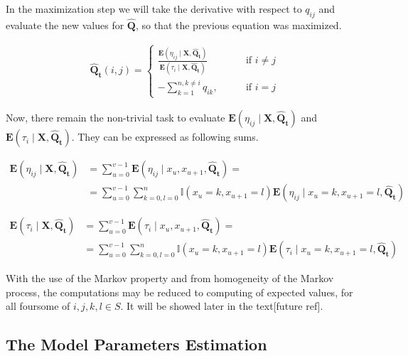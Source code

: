 \documentclass[thesis=M,english]{FITthesis}[2012/10/20]
\newcommand{\matr}[1]{\mathbf{#1}}
\begin{document}
In the maximization step we will take the derivative with respect to $q_{ij}$ and evaluate the new values for $\matr{ \hat Q }$, so that the previous equation was maximized. 

\begin{equation}\label{eq:Qmax}
\begin{aligned}  
\matr{ \hat Q_t }(i,j)= 
\begin{cases}
\frac{ \mathbf{E}(\eta_{ij} \mid \matr{X}, \matr{ \hat Q_t } )}{ \mathbf{E}( \tau_i \mid \matr{X}, \matr{\hat Q_t} ) } & \text{if } i\neq j\\
- \sum\limits_{k=1}^{n,k \neq i} q_{ik}, \qquad & \text{if } i=j
\end{cases}
\end{aligned}
\end{equation}

Now, there remain the non-trivial task to evaluate $\mathbf{E}( \eta_{ij} \mid \matr{X}, \matr{\hat Q_t} )$ and $\mathbf{E}( \tau_i \mid \matr{X}, \matr{ \hat Q_t } )$. They can be expressed as following sums.


\begin{equation}
\begin{aligned}  
\mathbf{E}(\eta_{ij} \mid \matr{X}, \matr{\hat Q_t} ) &= \sum_{u=0}^{v-1} \mathbf{E}(\eta_{ij} \mid x_u, x_{u+1}, \matr{ \hat Q_t } ) = \\
&= \sum_{u=0}^{v-1} \sum_{k=0,l=0}^{n} \mathbb{I}( x_u = k, x_{u+1} = l ) \mathbf{E}(\eta_{ij} \mid x_u = k, x_{u+1} = l, \matr{\hat Q_t} )
\end{aligned}
\end{equation}


\begin{equation}
\begin{aligned}  
\mathbf{E}( \tau_i \mid \matr{X}, \matr{\hat Q_t} ) &= \sum_{u=0}^{v-1} \mathbf{E}(\tau_i \mid x_u, x_{u+1}, \matr{ \hat Q_t } ) = \\
&= \sum_{u=0}^{v-1} \sum_{k=0,l=0}^{n} \mathbb{I}( x_u = k, x_{u+1} = l ) \mathbf{E}(\tau_i \mid x_u = k, x_{u+1} = l, \matr{\hat Q_t} )
\end{aligned}
\end{equation}
   
With the use of the Markov property and from homogeneity of the Markov process, the computations may be reduced to computing of expected values, for all foursome of $i,j,k,l \in S$. It will be showed later in the text[future ref].     
   
\subsection{The Model Parameters Estimation}
\end{document}
